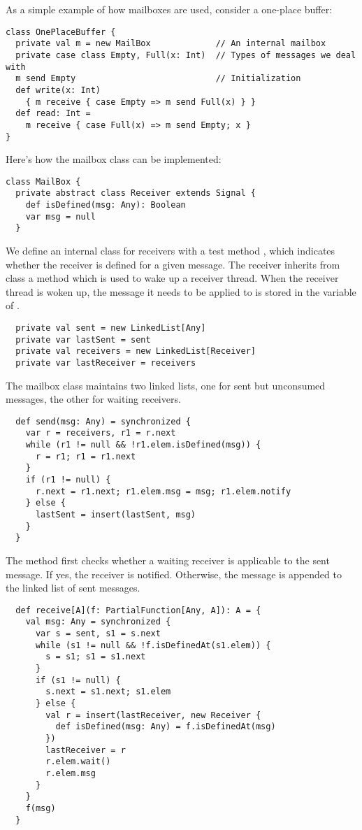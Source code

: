 As a simple example of how mailboxes are used, consider a
one-place buffer:
\begin{lstlisting}
class OnePlaceBuffer {
  private val m = new MailBox             // An internal mailbox
  private case class Empty, Full(x: Int)  // Types of messages we deal with
  m send Empty                            // Initialization
  def write(x: Int)
    { m receive { case Empty => m send Full(x) } }
  def read: Int =
    m receive { case Full(x) => m send Empty; x }
}
\end{lstlisting}
Here's how the mailbox class can be implemented:
\begin{lstlisting}
class MailBox {
  private abstract class Receiver extends Signal {
    def isDefined(msg: Any): Boolean
    var msg = null
  }
\end{lstlisting}
We define an internal class for receivers with a test method
, which indicates whether the receiver is
defined for a given message.  The receiver inherits from class
 a  method which is used to wake up a
receiver thread. When the receiver thread is woken up, the message it
needs to be applied to is stored in the  variable of
.
\begin{lstlisting}
  private val sent = new LinkedList[Any]
  private var lastSent = sent
  private val receivers = new LinkedList[Receiver]
  private var lastReceiver = receivers
\end{lstlisting}
The mailbox class maintains two linked lists,
one for sent but unconsumed messages, the other for waiting receivers.
\begin{lstlisting}
  def send(msg: Any) = synchronized {
    var r = receivers, r1 = r.next
    while (r1 != null && !r1.elem.isDefined(msg)) {
      r = r1; r1 = r1.next
    }
    if (r1 != null) {
      r.next = r1.next; r1.elem.msg = msg; r1.elem.notify
    } else {
      lastSent = insert(lastSent, msg)
    }
  }
\end{lstlisting}
The  method first checks whether a waiting receiver is
applicable to the sent message. If yes, the receiver is notified.
Otherwise, the message is appended to the linked list of sent messages.
\begin{lstlisting}
  def receive[A](f: PartialFunction[Any, A]): A = {
    val msg: Any = synchronized {
      var s = sent, s1 = s.next
      while (s1 != null && !f.isDefinedAt(s1.elem)) {
        s = s1; s1 = s1.next
      }
      if (s1 != null) {
        s.next = s1.next; s1.elem
      } else {
        val r = insert(lastReceiver, new Receiver {
          def isDefined(msg: Any) = f.isDefinedAt(msg)
        })
        lastReceiver = r
        r.elem.wait()
        r.elem.msg
      }
    }
    f(msg)
  }
\end{lstlisting}
